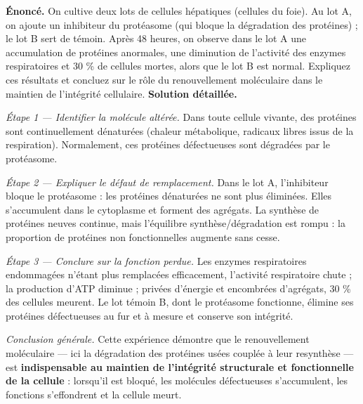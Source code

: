 \documentclass[11pt]{article}
\newcommand{\cle}[1]{{\popxbold\color{popdark}#1}}
\begin{document}
\begin{exoresolu}
\textbf{Énoncé.} On cultive deux lots de cellules hépatiques (cellules du foie). Au lot A, on ajoute un inhibiteur du protéasome (qui bloque la dégradation des protéines) ; le lot B sert de témoin. Après 48 heures, on observe dans le lot A une accumulation de protéines anormales, une diminution de l'activité des enzymes respiratoires et 30 \% de cellules mortes, alors que le lot B est normal. Expliquez ces résultats et concluez sur le rôle du renouvellement moléculaire dans le maintien de l'intégrité cellulaire.
\tcblower
\textbf{Solution détaillée.}

\emph{Étape 1 — Identifier la molécule altérée.} Dans toute cellule vivante, des protéines sont continuellement dénaturées (chaleur métabolique, radicaux libres issus de la respiration). Normalement, ces protéines défectueuses sont dégradées par le \cle{protéasome}.

\emph{Étape 2 — Expliquer le défaut de remplacement.} Dans le lot A, l'inhibiteur bloque le protéasome : les protéines dénaturées ne sont plus éliminées. Elles s'accumulent dans le cytoplasme et forment des agrégats. La synthèse de protéines neuves continue, mais l'équilibre synthèse/dégradation est rompu : la proportion de protéines non fonctionnelles augmente sans cesse.

\emph{Étape 3 — Conclure sur la fonction perdue.} Les enzymes respiratoires endommagées n'étant plus remplacées efficacement, l'activité respiratoire chute ; la production d'ATP diminue ; privées d'énergie et encombrées d'agrégats, 30 \% des cellules meurent. Le lot témoin B, dont le protéasome fonctionne, élimine ses protéines défectueuses au fur et à mesure et conserve son intégrité.

\emph{Conclusion générale.} Cette expérience démontre que le renouvellement moléculaire — ici la dégradation des protéines usées couplée à leur resynthèse — est \textbf{indispensable au maintien de l'intégrité structurale et fonctionnelle de la cellule} : lorsqu'il est bloqué, les molécules défectueuses s'accumulent, les fonctions s'effondrent et la cellule meurt.
\end{exoresolu}
\end{document}
